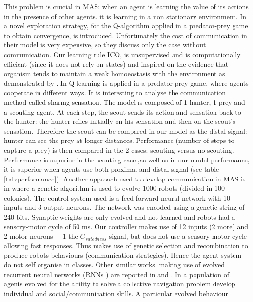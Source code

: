 This problem is crucial in MAS: when an agent is learning the value of its actions
in the presence of other agents, it is learning in a non stationary environment.
In \citep{Qlearning-MAS} a novel exploration strategy, for
the Q-algorithm applied in a predator-prey game to obtain convergence, is introduced.
Unfortunately the cost of communication in their model is very expensive,
so they discuss only the case without communication.
Our learning rule ICO, is unsupervised and is computationally efficient (since it does not rely on states)
and inspired on the evidence that organism tends to maintain a weak homoeostasis
with the environment as demonstrated by \citet{McFarland93}.
In \citep{tan97multiagent} Q-learning is applied in a predator-prey game,
where agents cooperate in different ways. It is interesting to analyse the
communication method called sharing sensation. The model is composed of 1 hunter,
1 prey and a scouting agent. At each step, the scout sends its action and sensation
back to the hunter: the hunter relies initially on his sensation and
then on the scout's sensation. Therefore the scout can be compared in our model
 as the distal signal: hunter can see the prey at longer distances.
Performance (number of steps to capture a prey) is then compared in the 2 cases:
scouting versus no scouting. Performance is superior in the scouting case
,as well as in our model performance, it is superior when agents use both
proximal and distal signal (see table \ref{tab:performance}).
Another approach used to develop communication in MAS is in \citet{Floreano-MAS}
where a genetic-algorithm is used to evolve 1000 robots (divided in 100 colonies).
The control system used is a feed-forward neural network with 10 inputs and 3 output neurons.
The network was encoded using a genetic string of 240 bits. Synaptic weights are only
evolved and not learned and robots had a sensory-motor cycle of 50 ms.
Our controller makes use of 12 inputs (2 more) and 2 motor neurons + 1 the
$G_{satedness}$ signal, but does not use a sensory-motor cycle allowing fast responses.
Thus \citet{Floreano-MAS} makes use of genetic selection and recombination to produce
robots behaviours (communication strategies). Hence the agent system do not self organise
in classes.
Other similar works, making use of evolved recurrent neural networks
(RNNs )
are reported in \citet{EmergenceCommMas} and \citet{OriginsComm}. In \citet{OriginsComm}
a population of agents evolved for the ability to solve a collective navigation problem
develop individual and social/communication skills. A particular evolved behaviour
